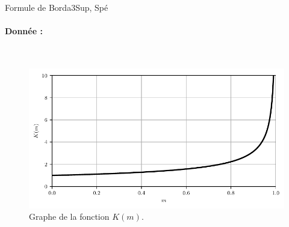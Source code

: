 \begin{exercise}{Formule de Borda}{3}{Sup, Spé}
\begin{questions}
\end{questions}

\paragraph{Donnée :}~\vspace{-3em}\\
\begin{figure}[H]
    \centering
    \includegraphics[scale=1]{meca/fonction_K.pdf}
    \vspace{-2em}
    \caption{Graphe de la fonction $K(m)$.}
\end{figure}
\end{exercise}

